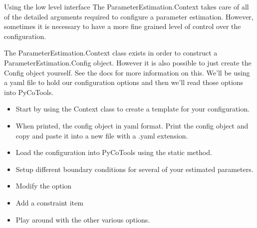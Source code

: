 \documentclass[../../main]{subfiles}
\begin{document}
\begin{Task}[label=AdvancedInterface]{Using the low level interface}
The ParameterEstimation.Context takes care of all of the detailed arguments required
to configure a parameter estimation. However, sometimes it is necessary to have a more
fine grained level of control over the configuration.

The ParameterEstimation.Context class exists in order to construct a ParameterEstimation.Config object.
However it is also possible to just create the Config object yourself. See the docs for more
information on this. We'll be using a yaml file to hold our configuration options and then we'll
read those options into PyCoTools.

\begin{itemize}
\item Start by using the Context class to create a template for your configuration.
\item When printed, the config object in yaml format. Print the config object
and copy and paste it into a new file with a .yaml extension.
\item Load the configuration into PyCoTools using the 
static method.
\item Setup different boundary conditions for several of your estimated parameters.
\item Modify the  option
\item Add a constraint item
\item Play around with the other various options.
\end{itemize}

\end{Task}
\end{document}
